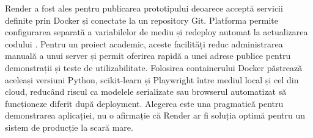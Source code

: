 Render a fost ales pentru publicarea prototipului deoarece acceptă servicii definite prin Docker și conectate la un repository Git. Platforma permite configurarea separată a variabilelor de mediu și redeploy automat la actualizarea codului \cite{render_docs}. Pentru un proiect academic, aceste facilități reduc administrarea manuală a unui server și permit oferirea rapidă a unei adrese publice pentru demonstrații și teste de utilizabilitate. Folosirea containerului Docker păstrează aceleași versiuni Python, scikit-learn și Playwright între mediul local și cel din cloud, reducând riscul ca modelele serializate sau browserul automatizat să funcționeze diferit după deployment. Alegerea este una pragmatică pentru demonstrarea aplicației, nu o afirmație că Render ar fi soluția optimă pentru un sistem de producție la scară mare.
